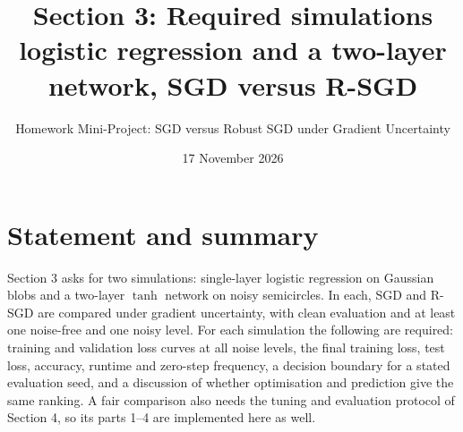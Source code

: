 \documentclass[11pt,a4paper]{article}
\title{Section 3: Required simulations\\[0.2em]
\large logistic regression and a two-layer network, SGD versus R-SGD}
\author{Homework Mini-Project: SGD versus Robust SGD under Gradient Uncertainty}
\date{17 November 2026}
\begin{document}
\maketitle

\section*{Statement and summary}

Section 3 asks for two simulations: single-layer logistic regression on Gaussian
blobs and a two-layer $\tanh$ network on noisy semicircles. In each, SGD and R-SGD are
compared under gradient uncertainty, with clean evaluation and at least one noise-free and
one noisy level. For each simulation the following are required: training and validation
loss curves at all noise levels, the final training loss, test loss, accuracy, runtime and
zero-step frequency, a decision boundary for a stated evaluation seed, and a discussion of
whether optimisation and prediction give the same ranking. A fair comparison also needs the
tuning and evaluation protocol of Section 4, so its parts 1--4 are implemented here as well.
\end{document}
